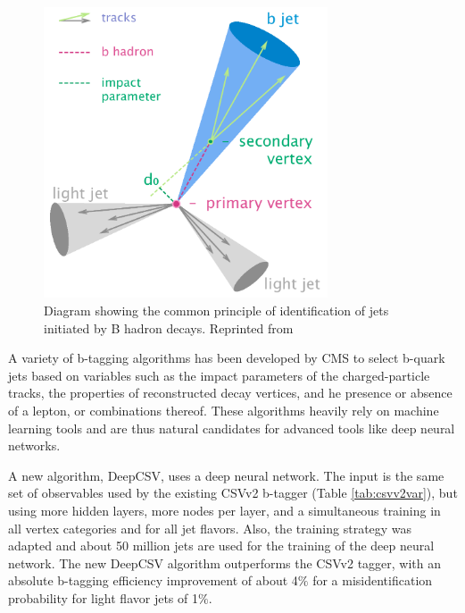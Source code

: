\begin{figure}[h]
  	\label{fig:antikt}
 	\centering
 	\includegraphics[width=0.75\textwidth]{figures/Btag.png}
 	\singlespace
 	\caption{Diagram showing the common principle of identification of jets initiated by B hadron decays. Reprinted from \cite{wiki:btag}}
 \end{figure}

A variety of b-tagging algorithms has been developed by CMS to select b-quark jets\cite{BTV-12-001} based on variables such as the impact parameters of the charged-particle tracks, the properties of reconstructed decay vertices, and he presence or absence of a lepton, or combinations thereof. These algorithms heavily rely on machine learning tools and are thus natural candidates for advanced tools like deep neural networks. 

A new algorithm, DeepCSV\cite{Sirunyan_2018, PhysRevD.94.112002}, uses a deep neural network. The input is the same set of observables used by the existing CSVv2 b-tagger (Table \ref{tab:csvv2var})\cite{Weiser:927399}, but using more hidden layers, more nodes per layer, and a simultaneous training in all vertex categories and for all jet flavors. Also, the training strategy was adapted and about 50 million jets are used for the training of the deep neural network. The new DeepCSV algorithm outperforms the CSVv2 tagger, with an absolute b-tagging efficiency improvement of about 4$\%$ for a misidentification probability for light flavor jets of 1$\%$. 

